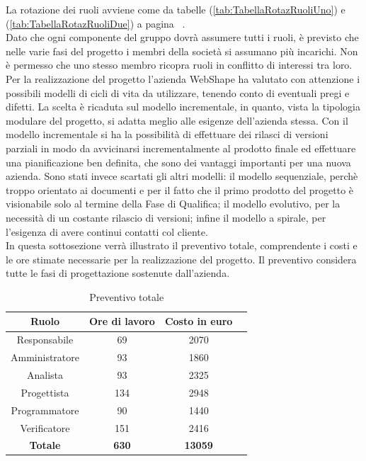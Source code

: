 La rotazione dei ruoli avviene come da tabelle (\ref{tab:TabellaRotazRuoliUno}) e (\ref{tab:TabellaRotazRuoliDue}) a pagina ~\pageref{tab:TabellaRotazRuoliUno}.\\
Dato che ogni componente del gruppo dovr\`a assumere tutti i ruoli, \`e previsto che nelle varie fasi del progetto i membri della societ\`a si assumano pi\`u incarichi. Non \`e permesso che uno stesso membro ricopra ruoli in conflitto di interessi tra loro.\\

Per la realizzazione del progetto l'azienda WebShape ha valutato con attenzione i possibili modelli di cicli di vita da utilizzare, tenendo conto di eventuali pregi e difetti. 
La scelta \`e ricaduta sul modello incrementale, in quanto, vista la tipologia modulare del progetto, si adatta meglio alle esigenze dell'azienda stessa. Con il modello incrementale si ha la possibilit\`a di effettuare dei rilasci di versioni parziali in modo da avvicinarsi incrementalmente al prodotto finale ed effettuare una pianificazione ben definita, che sono dei vantaggi importanti per una nuova azienda. Sono stati invece scartati gli altri modelli: il modello sequenziale, perch\`e troppo orientato ai documenti e per il fatto che il primo prodotto del progetto \`e visionabile solo al termine della Fase di Qualifica; il modello evolutivo, per la necessit\`a di un costante rilascio di versioni; infine il modello a spirale, per l'esigenza di avere continui contatti col cliente.\\
In questa sottosezione verr\` a illustrato il preventivo totale, comprendente i costi e le ore stimate necessarie per la realizzazione del progetto. Il preventivo considera tutte le fasi di progettazione sostenute dall'azienda.

\begin{table}[h]
	\begin{center}
		  \begin{tabular}{|c|c|c|c|}
		 \hline 
		 \textbf{Ruolo} & \textbf{Ore di lavoro} & \textbf{Costo in euro}\\
		 \hline
		Responsabile & 69 & 2070 \\
		Amministratore & 93 & 1860\\
		Analista & 93 & 2325\\
		Progettista & 134 & 2948\\
		Programmatore & 90 & 1440 \\
		Verificatore & 151 & 2416\\
        \hline
        \textbf{Totale} & \textbf{630} & \textbf{13059}\\
		\hline
		\end{tabular}
	\caption{Preventivo totale} 
	\label{tab:tabella_preventivo}
	\end{center}	
\end{table}

